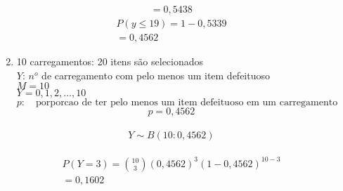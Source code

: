 \documentclass[11pt,a4paper]{book}
\begin{document}
\begin{description}
\begin{enumerate}[label=(\alph*)]
\begin{align*}
            =0,5438
          \end{align*}
          \begin{align*}
            P(y\le 19)=1-0,5339\\
            =0,4562
          \end{align*}
        \item 10 carregamentos: 20 itens são selecionados \\
          $Y$: $n^o$ de carregamento com pelo menos um item defeituoso \\
          $M=10$\\
          $Y=0,1,2,\ldots,10$\\
          $p:\quad \text{porporcao de ter pelo menos um item defeituoso em um carregamento}$\\
          $$p=0,4562$$\\
          $$Y \sim B(10:0,4562)$$\\
          \begin{align*}
            P(Y=3)=\binom{10}{3}(0,4562)^3 (1-0,4562)^{10-3}\\
            =0,1602
          \end{align*}
      \end{enumerate}
    \end{description}
\end{document}
